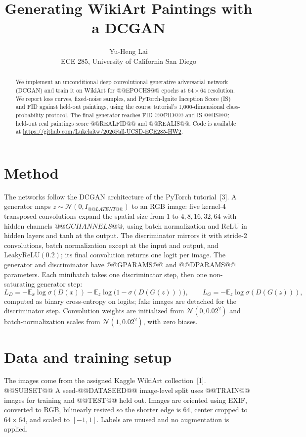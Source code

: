 \documentclass{article}
\title{Generating WikiArt Paintings with a DCGAN}
\author{Yu-Heng Lai \\ ECE 285, University of California San Diego}
\begin{document}
\maketitle
\begin{abstract}
We implement an unconditional deep convolutional generative adversarial network (DCGAN)
and train it on WikiArt for @@EPOCHS@@ epochs at $64\times64$ resolution.
We report loss curves, fixed-noise samples, and PyTorch-Ignite Inception Score (IS)
and FID against held-out paintings, using the course tutorial's 1,000-dimensional
class-probability protocol. The final generator reaches FID @@FID@@ and IS @@IS@@;
held-out real paintings score @@REALFID@@ and @@REALIS@@.
Code is available at \url{https://github.com/Lukelaitw/2026Fall-UCSD-ECE285-HW2}.
\end{abstract}

\section{Method}
The networks follow the DCGAN architecture of the PyTorch tutorial~[3].
A generator maps $z\sim\mathcal{N}(0,I_{@@LATENT@@})$ to an RGB image:
five kernel-4 transposed convolutions expand the spatial size from $1$ to
$4,8,16,32,64$ with hidden channels $@@GCHANNELS@@$, using batch normalization and ReLU
in hidden layers and tanh at the output.
The discriminator mirrors it with stride-2 convolutions, batch normalization except at
the input and output, and LeakyReLU$(0.2)$; its final convolution returns one logit per image.
The generator and discriminator have @@GPARAMS@@ and @@DPARAMS@@ parameters.
Each minibatch takes one discriminator step, then one non-saturating generator step:
\[
L_D=-\mathbb{E}_{x}\log\sigma(D(x))-\mathbb{E}_{z}\log\bigl(1-\sigma(D(G(z)))\bigr),\qquad
L_G=-\mathbb{E}_{z}\log\sigma(D(G(z))),
\]
computed as binary cross-entropy on logits; fake images are detached for the discriminator step.
Convolution weights are initialized from $\mathcal{N}(0,0.02^2)$ and
batch-normalization scales from $\mathcal{N}(1,0.02^2)$, with zero biases.

\section{Data and training setup}
The images come from the assigned Kaggle WikiArt collection~[1]. @@SUBSET@@
A seed-@@DATASEED@@ image-level split uses @@TRAIN@@ images for training and @@TEST@@ held out.
Images are oriented using EXIF, converted to RGB, bilinearly resized so the
shorter edge is 64, center cropped to $64\times64$, and scaled to $[-1,1]$.
Labels are unused and no augmentation is applied.
\end{document}
